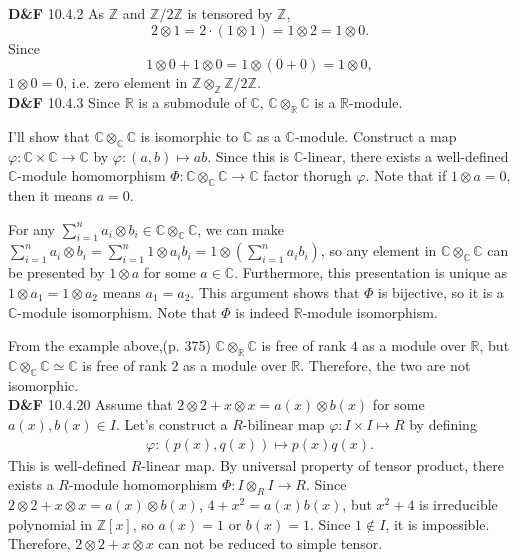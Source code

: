 \documentclass[a4paper, 12pt]{article}
\theoremstyle{Mydefinition}
\theoremstyle{Mytheorem}
\begin{document}
\noindent \textbf{D\&F} 10.4.2
As $\mathbb{Z}$ and $\mathbb{Z}/2\mathbb{Z}$ is tensored by $\mathbb{Z}$,
\begin{equation}
    2\otimes 1 = 2\cdot (1\otimes 1) = 1 \otimes 2 = 1 \otimes 0.
\end{equation}
Since
\begin{equation}
    1 \otimes 0 + 1 \otimes 0 = 1\otimes (0+0) = 1\otimes 0,
\end{equation}
$1\otimes 0 = 0$, i.e. zero element in $\mathbb{Z}\otimes_\mathbb{Z} \mathbb{Z}/2\mathbb{Z}$.\\

\noindent \textbf{D\&F} 10.4.3
Since $\mathbb{R}$ is a submodule of $\mathbb{C}$, $\mathbb{C}\otimes_\mathbb{R}\mathbb{C}$ is a $\mathbb{R}$-module.

I'll show that $\mathbb{C}\otimes_\mathbb{C}\mathbb{C}$ is isomorphic to $\mathbb{C}$ as a $\mathbb{C}$-module. Construct a map $\varphi:\mathbb{C}\times \mathbb{C}\rightarrow \mathbb{C}$ by $\varphi:(a, b) \mapsto ab$. Since this is $\mathbb{C}$-linear, there exists a well-defined $\mathbb{C}$-module homomorphism $\Phi:\mathbb{C}\otimes_\mathbb{C} \mathbb{C}\rightarrow \mathbb{C}$ factor thorugh $\varphi$. Note that if $1\otimes a = 0$, then it means $a=0$.

For any $\sum_{i=1}^n a_i\otimes b_i\in \mathbb{C}\otimes_\mathbb{C}\mathbb{C}$, we can make $\sum_{i=1}^n a_i\otimes b_i =\sum_{i=1}^n 1\otimes a_ib_i = 1\otimes \left(\sum_{i=1}^n a_ib_i\right)$, so any element in $\mathbb{C}\otimes_\mathbb{C}\mathbb{C}$ can be presented by $1\otimes a$ for some $a\in\mathbb{C}$. Furthermore, this presentation is unique as $1\otimes a_1 = 1\otimes a_2$ means $a_1=a_2$. This argument shows that $\Phi$ is bijective, so it is a $\mathbb{C}$-module isomorphism. Note that $\Phi$ is indeed $\mathbb{R}$-module isomorphism.

From the example above,(p. 375) $\mathbb{C}\otimes_\mathbb{R}\mathbb{C}$ is free of rank $4$ as a module over $\mathbb{R}$, but $\mathbb{C}\otimes_\mathbb{C}\mathbb{C}\simeq \mathbb{C}$ is free of rank $2$ as a module over $\mathbb{R}$. Therefore, the two are not isomorphic.\\

\noindent \textbf{D\&F} 10.4.20
Assume that $2\otimes 2 + x\otimes x = a(x)\otimes b(x)$ for some $a(x),b(x)\in I$. Let's construct a $R$-bilinear map $\varphi : I\times I\mapsto R$ by defining
\begin{equation}
    \begin{split}
        \varphi:(p(x), q(x))\mapsto p(x)q(x).
    \end{split}
\end{equation}
This is well-defined $R$-linear map. By universal property of tensor product, there exists a $R$-module homomorphism $\Phi:I\otimes_R I\rightarrow R$. Since $2\otimes 2 + x\otimes x = a(x)\otimes b(x)$, $4+x^2 = a(x)b(x)$, but $x^2+4$ is irreducible polynomial in $\mathbb{Z}[x]$, so $a(x)=1$ or $b(x)=1$. Since $1\not\in I$, it is impossible. Therefore, $2\otimes 2 + x\otimes x$ can not be reduced to simple tensor.\\
\end{document}
